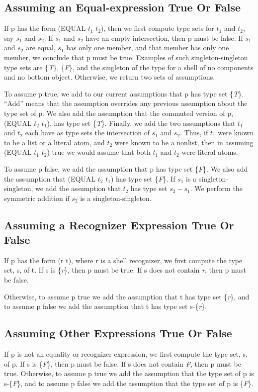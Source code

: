 \documentclass[10pt]{book}
\begin{document}
\subsection{Assuming an Equal-expression True Or False}
If p has the form (EQUAL $t_{1}$ $t_{2}$), then
we first compute type sets for $t_{1}$ and $t_{2}$, say $s_{1}$ and $s_{2}$.
If $s_{1}$ and $s_{2}$ have an empty intersection, then p
must be false.  If $s_{1}$ and $s_{2}$ are equal,
$s_{1}$ has only one member, and that member has only one member,
we conclude that p
must be true.  Examples of such singleton-singleton type sets are
\{\emph{T}\}, \{\emph{F}\}, and the  singleton of the type 
for a  shell 
of no components and no bottom object.  Otherwise, we return two
sets of assumptions.

To assume p true, we add		
to our current   assumptions that p has type set \{\emph{T}\}.
``Add'' means that the
assumption overrides any previous assumption about the type set of p.
We also add the assumption that the commuted version of p, (EQUAL $t_{2}$ $t_{1}$),
has type set \{\emph{T}\}.  Finally, we add the two assumptions that $t_{1}$ and $t_{2}$ each
have as type sets the intersection of
$s_{1}$ and $s_{2}$.  Thus, if $t_{1}$ were known to be a list or a literal atom,
and $t_{2}$ were known to be a nonlist, then in  assuming (EQUAL $t_{1}$ $t_{2}$)
true we would assume that both $t_{1}$ and $t_{2}$ were literal atoms.

To  assume p false, we add	
the assumption that p has type set \{\emph{F}\}.
We also add the assumption  that (EQUAL $t_{2}$ $t_{1}$) has type
set \{\emph{F}\}.  If $s_{1}$ is a singleton-singleton, we add
the assumption that $t_{2}$ has
type set $s_{2} -s_{1}$.  We perform the symmetric addition
if $s_{2}$ is a singleton-singleton.

\subsection{Assuming a Recognizer Expression True Or False}
If p  has the form (r t), where r is a shell recognizer,
we first compute the type set, s, of t.  If s is  \{\emph{r}\}, then
p must be true.  If s does not contain \emph{r}, then p must be false.

Otherwise, to assume p true we add the assumption
that t has type set \{\emph{r}\}, and to assume p false we add the assumption
that t has type set s-\{\emph{r}\}.

\subsection{Assuming Other Expressions True Or False}
If p is not an equality or recognizer expression, we first
compute the type set, s, of p.  If s is \{\emph{F}\},
then p must be false.  If s does not contain \emph{F}, then p must be true.
Otherwise, to assume p true we add the assumption that the type set of
p is s-\{\emph{F}\}, and to assume p false we add the assumption that the type
set of p is \{\emph{F}\}.
\end{document}
